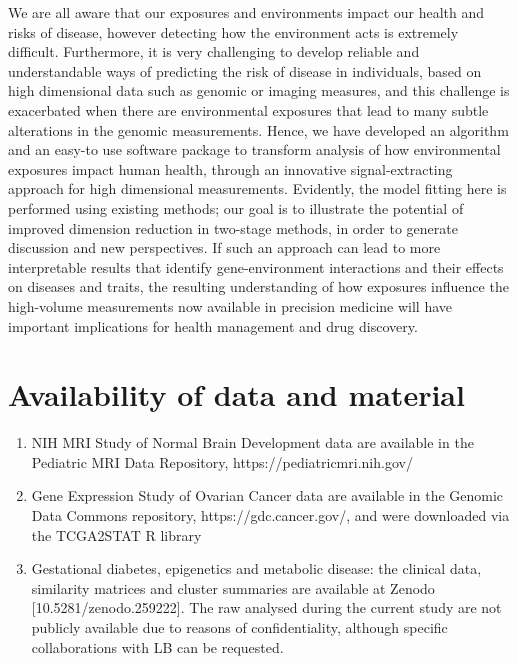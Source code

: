 We are all aware that our exposures and environments impact our health and risks of disease, however detecting how the environment acts is extremely difficult.   Furthermore, it is very challenging to develop reliable and understandable ways of predicting the risk of disease in individuals, based on high dimensional data such as genomic or imaging measures, and this challenge is exacerbated when there are environmental exposures that lead to many subtle alterations in the genomic measurements.  Hence, we have developed an algorithm and an easy-to use software package to transform analysis of how environmental exposures impact human health, through an innovative signal-extracting approach for high dimensional measurements.  Evidently, the model fitting here is performed using existing methods; our goal is to illustrate the potential of improved dimension reduction in two-stage methods, in order to generate discussion and new perspectives.   
If such an approach can lead to more interpretable results that identify gene-environment interactions and their effects on diseases and traits,  the resulting understanding of how exposures influence the high-volume measurements now available in precision medicine will have important implications for health management and drug discovery.  

\section*{Availability of data and material}
\begin{enumerate}
	\item NIH MRI Study of Normal Brain Development data are available in the Pediatric MRI Data Repository, https://pediatricmri.nih.gov/
	\item Gene Expression Study of Ovarian Cancer data are available in the Genomic Data Commons repository, https://gdc.cancer.gov/, and were downloaded via the TCGA2STAT R library~\citep{tcga2stat}
	\item Gestational diabetes, epigenetics and metabolic disease: the clinical data, similarity matrices and cluster summaries are available at Zenodo [10.5281/zenodo.259222]. The raw analysed during the current study are not publicly available due to reasons of confidentiality, although specific collaborations with LB can be requested.
\end{enumerate}

